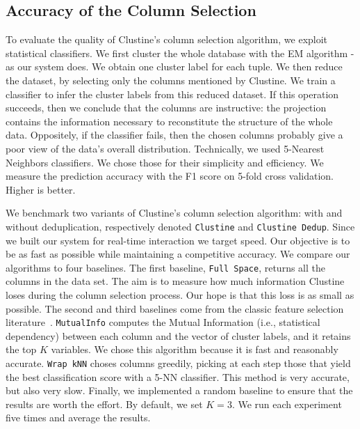 \subsection{Accuracy of the Column Selection}
\label{sec:accuracy}
To evaluate the quality of Clustine's column selection algorithm, we exploit
statistical classifiers. We first cluster the whole database with the EM
algorithm - as our system does. We obtain one cluster label for each tuple. We
then reduce the dataset, by selecting only the columns mentioned by Clustine.
We train a classifier to infer the cluster labels from this reduced dataset.
If this operation succeeds, then we conclude that the columns are instructive:
the projection contains the information necessary to reconstitute the structure
of the whole data.  Oppositely, if the classifier fails, then the chosen
columns probably give a poor view of the data's overall distribution.
Technically, we used 5-Nearest Neighbors classifiers. We chose those for their
simplicity and efficiency.  We measure the prediction accuracy with the F1
score on 5-fold cross validation.  Higher is better.

We benchmark two variants of Clustine's column selection algorithm: with and
without deduplication, respectively denoted \texttt{Clustine} and
\texttt{Clustine Dedup}. Since we built our system for real-time interaction we
target speed. Our objective is to be as fast as possible while maintaining a
competitive accuracy.  We compare our algorithms to four baselines. The first
baseline, \texttt{Full Space}, returns all the columns in the data set. The aim
is to measure how much information Clustine loses during the column selection
process. Our hope is that this loss is as small as possible. The second and
third baselines come from the classic feature selection
literature~\cite{guyon2003introduction}.  \texttt{MutualInfo} computes the
Mutual Information (i.e., statistical dependency) between each column and the
vector of cluster labels, and it retains the top $K$ variables. We chose this
algorithm because it is fast and reasonably accurate. \texttt{Wrap kNN} choses
columns greedily, picking at each step those that yield the best classification
score with a 5-NN classifier. This method is very accurate, but also very slow.
Finally, we implemented a random baseline to ensure that the results are worth
the effort.  By default, we set $K=3$. We run each experiment five times and
average the results. 

